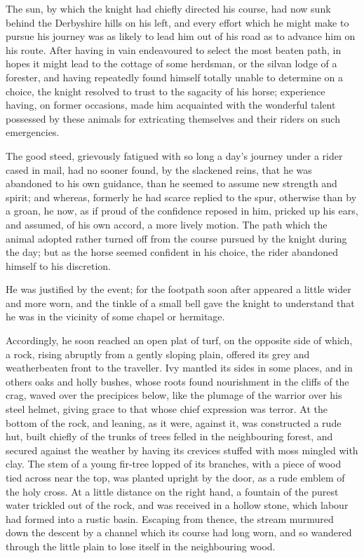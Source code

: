 The sun, by which the knight had chiefly directed his course, had now
sunk behind the Derbyshire hills on his left, and every effort which he
might make to pursue his journey was as likely to lead him out of his
road as to advance him on his route. After having in vain endeavoured to
select the most beaten path, in hopes it might lead to the cottage of
some herdsman, or the silvan lodge of a forester, and having repeatedly
found himself totally unable to determine on a choice, the knight
resolved to trust to the sagacity of his horse; experience having, on
former occasions, made him acquainted with the wonderful talent
possessed by these animals for extricating themselves and their riders
on such emergencies.

The good steed, grievously fatigued with so long a day's journey under a
rider cased in mail, had no sooner found, by the slackened reins, that
he was abandoned to his own guidance, than he seemed to assume new
strength and spirit; and whereas, formerly he had scarce replied to the
spur, otherwise than by a groan, he now, as if proud of the confidence
reposed in him, pricked up his ears, and assumed, of his own accord, a
more lively motion. The path which the animal adopted rather turned off
from the course pursued by the knight during the day; but as the horse
seemed confident in his choice, the rider abandoned himself to his
discretion.

He was justified by the event; for the footpath soon after appeared a
little wider and more worn, and the tinkle of a small bell gave the
knight to understand that he was in the vicinity of some chapel or
hermitage.

Accordingly, he soon reached an open plat of turf, on the opposite side
of which, a rock, rising abruptly from a gently sloping plain, offered
its grey and weatherbeaten front to the traveller. Ivy mantled its sides
in some places, and in others oaks and holly bushes, whose roots found
nourishment in the cliffs of the crag, waved over the precipices below,
like the plumage of the warrior over his steel helmet, giving grace to
that whose chief expression was terror. At the bottom of the rock, and
leaning, as it were, against it, was constructed a rude hut, built
chiefly of the trunks of trees felled in the neighbouring forest, and
secured against the weather by having its crevices stuffed with moss
mingled with clay. The stem of a young fir-tree lopped of its branches,
with a piece of wood tied across near the top, was planted upright by
the door, as a rude emblem of the holy cross. At a little distance on
the right hand, a fountain of the purest water trickled out of the rock,
and was received in a hollow stone, which labour had formed into a
rustic basin. Escaping from thence, the stream murmured down the descent
by a channel which its course had long worn, and so wandered through the
little plain to lose itself in the neighbouring wood.

